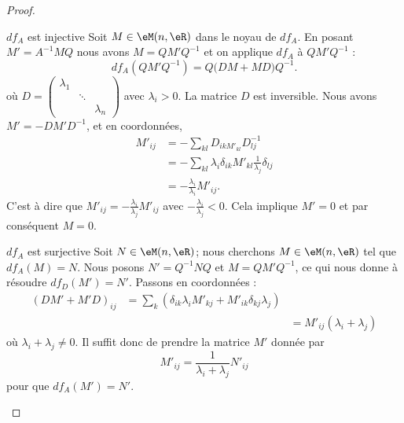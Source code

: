 \begin{proof}
    \begin{subproof}
        \item[\( df_A\) est injective]
            Soit \( M\in \eM(n,\eR)\) dans le noyau de \( df_A\). En posant \( M'=A^{-1}MQ\) nous avons \( M=QM'Q^{-1}\) et on applique \( df_A\) à \( QM'Q^{-1}\) :
            \begin{equation}
                df_A(QM'Q^{-1})=Q\big( DM+MD \big)Q^{-1}.
            \end{equation}
            où \( D=\begin{pmatrix}
                \lambda_1    &       &       \\
                    &   \ddots    &       \\
                    &       &   \lambda_n
                \end{pmatrix}\) avec \( \lambda_i>0\). La matrice \( D\) est inversible. Nous avons \( M'=-DM'D^{-1}\), et en coordonnées,
                \begin{subequations}
                    \begin{align}
                        M'_{ij}&=-\sum_{kl}D_{ikM'_{kl}}D^{-1}_{lj}\\
                        &=-\sum_{kl}\lambda_i\delta_{ik}M'_{kl}\frac{1}{ \lambda_j }\delta_{lj}\\
                        &=-\frac{ \lambda_i }{ \lambda_i }M'_{ij}.
                    \end{align}
                \end{subequations}
                C'est à dire que \( M'_{ij}=-\frac{ \lambda_i }{ \lambda_j }M'_{ij}\) avec \( -\frac{ \lambda_i }{ \lambda_j }<0\). Cela implique \( M'=0\) et par conséquent \( M=0\).
            \item[\( df_A\) est surjective]
                Soit \( N\in \eM(n,\eR)\); nous cherchons \( M\in \eM(n,\eR)\) tel que \( df_A(M)=N\). Nous posons \( N'=Q^{-1} NQ\) et \( M=QM'Q^{-1}\), ce qui nous donne à résoudre \( df_D(M')=N'\). Passons en coordonnées :
                \begin{subequations}
                    \begin{align}
                        (DM'+M'D)_{ij}&=\sum_k(\delta_{ik}\lambda_iM'_{kj}+M'_{ik}\delta_{kj}\lambda_j)\\&
                        &=M'_{ij}(\lambda_i+\lambda_j)
                    \end{align}
                \end{subequations}
                où \( \lambda_i+\lambda_j\neq 0\). Il suffit donc de prendre la matrice \( M'\) donnée par
                \begin{equation}
                    M'_{ij}=\frac{1}{ \lambda_i+\lambda_j }N'_{ij}
                \end{equation}
                pour que \( df_A(M')=N'\).
    \end{subproof}


\end{proof}
